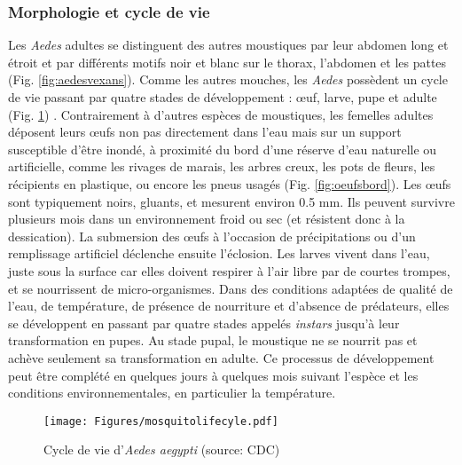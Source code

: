 \subsubsection{Morphologie et cycle de vie}
Les {\em Aedes} adultes se distinguent des autres moustiques par leur abdomen long et étroit et par différents motifs noir et blanc sur le thorax, l'abdomen et les pattes (Fig. \ref{fig:aedesvexans}).
Comme les autres mouches, les {\em Aedes} possèdent un cycle de vie passant par quatre stades de développement : \oe uf, larve, pupe et adulte (Fig. \ref{fig:mosquitolifecyle}) \cite{christophers1960aedes}.
Contrairement à d'autres espèces de moustiques, les femelles adultes déposent leurs \oe ufs non pas directement dans l'eau mais sur un support susceptible d'être inondé, à proximité du bord d'une réserve d'eau naturelle ou artificielle, comme les rivages de marais, les arbres creux, les pots de fleurs, les récipients en plastique, ou encore les pneus usagés (Fig. \ref{fig:oeufsbord}).
Les \oe ufs sont typiquement noirs, gluants, et mesurent environ 0.5 mm.
Ils peuvent survivre plusieurs mois dans un environnement froid ou sec (et résistent donc à la dessication).
La submersion des \oe ufs à l'occasion de précipitations ou d'un remplissage artificiel déclenche ensuite l'éclosion.
Les larves vivent dans l'eau, juste sous la surface car elles doivent respirer à l'air libre par de courtes trompes, et se nourrissent de micro-organismes. 
Dans des conditions adaptées de qualité de l'eau, de température, de présence de nourriture et d'absence de prédateurs, elles se développent en passant par quatre stades appelés {\em instars} jusqu'à leur transformation en pupes.
Au stade pupal, le moustique ne se nourrit pas et achève seulement sa transformation en adulte.
Ce processus de développement peut être complété en quelques jours à quelques mois suivant l'espèce et les conditions environnementales, en particulier la température.


\begin{figure}[h]
	\centering
	\texttt{[image: Figures/mosquitolifecyle.pdf]}
	\caption{Cycle de vie d'{\em Aedes aegypti} (source: CDC)}
	\label{fig:mosquitolifecyle}
\end{figure}

